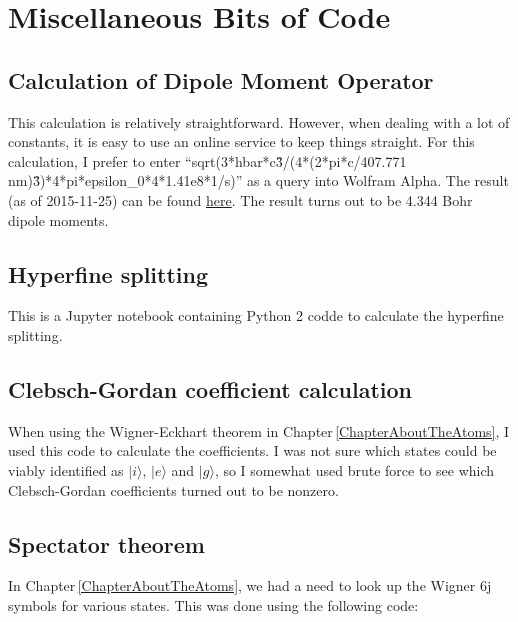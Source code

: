 \chapter{Miscellaneous Bits of Code}
\label{sympy6jAppendix}

\section{Calculation of Dipole Moment Operator}
This calculation is relatively straightforward. However, when dealing with a lot of constants, it is easy to use an online service to keep things straight. For this calculation, I prefer to enter ``sqrt(3*hbar*c\^3/(4*(2*pi*c/407.771 nm)\^3)*4*pi*epsilon\_0*4*1.41e8*1/s)'' as a query into Wolfram Alpha. The result (as of 2015-11-25) can be found 
\href{http://www.wolframalpha.com/input/?i=sqrt%283*hbar*c%5E3%2F%284*%282*pi*c%2F407.771+nm%29%5E3%29*4*pi*epsilon_0*4*1.41e8*1%2Fs%29}{here}.
The result turns out to be 4.344 Bohr dipole moments.
\section{Hyperfine splitting}
This is a Jupyter notebook containing Python 2 codde to calculate the hyperfine splitting.

\section{Clebsch-Gordan coefficient calculation}
When using the Wigner-Eckhart theorem in Chapter\,\ref{ChapterAboutTheAtoms}, I used this code to calculate the coefficients. I was not sure which states could be viably identified as $|i\rangle$, $|e\rangle$ and $|g\rangle$, so I somewhat used brute force to see which Clebsch-Gordan coefficients turned out to be nonzero. 

\section{Spectator theorem}
In Chapter\,\ref{ChapterAboutTheAtoms}, we had a need to look up the Wigner 6j symbols for various states. This was done using the following code:

